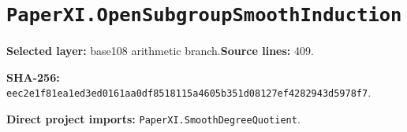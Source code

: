 \documentclass[10pt,oneside]{book}
\begin{document}
\section{\texorpdfstring{\nolinkurl{PaperXI.OpenSubgroupSmoothInduction}}{PaperXI.OpenSubgroupSmoothInduction}}\label{module:PaperXI.OpenSubgroupSmoothInduction}

\textbf{Selected layer:} base108 arithmetic branch.\quad\textbf{Source lines:} 409.\par\textbf{SHA-256:} {\scriptsize\nolinkurl{eec2e1f81ea1ed3ed0161aa0df8518115a4605b351d08127ef4282943d5978f7}}.


\textbf{Direct project imports:} \nolinkurl{PaperXI.SmoothDegreeQuotient}.
\end{document}
